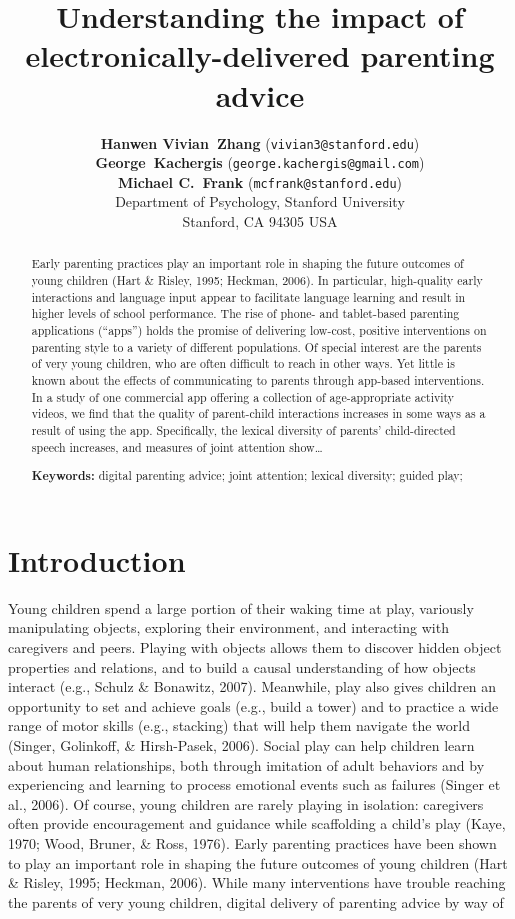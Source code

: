 \documentclass[10pt, letterpaper]{article}
\title{Understanding the impact of electronically-delivered parenting advice}
\author{{\large\bf Hanwen Vivian~Zhang} (\texttt{vivian3@stanford.edu}) \\ {\large\bf George~Kachergis} (\texttt{george.kachergis@gmail.com}) \\ {\large\bf Michael C.~Frank} (\texttt{mcfrank@stanford.edu}) \\  Department of Psychology, Stanford University \\  Stanford, CA 94305 USA}
\begin{document}
\maketitle

\begin{abstract}
Early parenting practices play an important role in shaping the future
outcomes of young children (Hart \& Risley, 1995; Heckman, 2006). In
particular, high-quality early interactions and language input appear to
facilitate language learning and result in higher levels of school
performance. The rise of phone- and tablet-based parenting applications
(``apps'') holds the promise of delivering low-cost, positive
interventions on parenting style to a variety of different populations.
Of special interest are the parents of very young children, who are
often difficult to reach in other ways. Yet little is known about the
effects of communicating to parents through app-based interventions. In
a study of one commercial app offering a collection of age-appropriate
activity videos, we find that the quality of parent-child interactions
increases in some ways as a result of using the app. Specifically, the
lexical diversity of parents' child-directed speech increases, and
measures of joint attention show\ldots{}

\textbf{Keywords:}
digital parenting advice; joint attention; lexical diversity; guided
play;
\end{abstract}

\section{Introduction}\label{introduction}

Young children spend a large portion of their waking time at play,
variously manipulating objects, exploring their environment, and
interacting with caregivers and peers. Playing with objects allows them
to discover hidden object properties and relations, and to build a
causal understanding of how objects interact (e.g., Schulz \& Bonawitz,
2007). Meanwhile, play also gives children an opportunity to set and
achieve goals (e.g., build a tower) and to practice a wide range of
motor skills (e.g., stacking) that will help them navigate the world
(Singer, Golinkoff, \& Hirsh-Pasek, 2006). Social play can help children
learn about human relationships, both through imitation of adult
behaviors and by experiencing and learning to process emotional events
such as failures (Singer et al., 2006). Of course, young children are
rarely playing in isolation: caregivers often provide encouragement and
guidance while scaffolding a child's play (Kaye, 1970; Wood, Bruner, \&
Ross, 1976). Early parenting practices have been shown to play an
important role in shaping the future outcomes of young children (Hart \&
Risley, 1995; Heckman, 2006). While many interventions have trouble
reaching the parents of very young children, digital delivery of
parenting advice by way of
\end{document}
